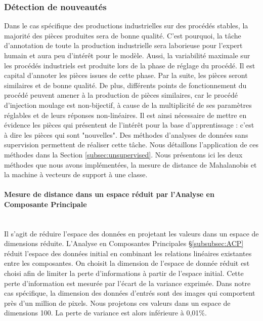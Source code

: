 \subsubsection{Détection de nouveautés}
Dans le cas spécifique des productions industrielles sur des procédés stables, la majorité des pièces produites sera de bonne qualité.
C'est pourquoi, la tâche d'annotation de toute la production industrielle sera laborieuse pour l'expert humain et aura peu d'intérêt pour le modèle.
Aussi, la variabilité maximale sur les procédés industriels est produite lors de la phase de réglage du procédé.
Il est capital d'annoter les pièces issues de cette phase.
Par la suite, les pièces seront similaires et de bonne qualité.
De plus, différents points de fonctionnement du procédé peuvent amener à la production de pièces similaires, car le procédé d'injection moulage est non-bijectif, à cause de la multiplicité de ses paramètres réglables et de leurs réponses non-linéaires.
Il est ainsi nécessaire de mettre en évidence les pièces qui présentent de l'intérêt pour la base d'apprentissage : c'est à dire les pièces qui sont "nouvelles".
Des méthodes d'analyses de données sans supervision permettent de réaliser cette tâche.
Nous détaillons l'application de ces méthodes dans la Section \ref{subsec:unsupervised}.
Nous présentons ici les deux méthodes que nous avons implémentées, la mesure de distance de Mahalanobis et la machine à vecteurs de support à une classe.

\paragraph{Mesure de distance dans un espace réduit par l'Analyse en Composante Principale}\mbox{} \\
Il s'agit de réduire l'espace des données en projetant les valeurs dans un espace de dimensions réduite.
L'Analyse en Composantes Principales §\ref{subsubsec:ACP} réduit l'espace des données initial en combinant les relations linéaires existantes entre les composantes.
On choisit la dimension de l'espace de donnée réduit est choisi afin de limiter la perte d'informations à partir de l'espace initial.
Cette perte d'information est mesurée par l'écart de la variance exprimée.
Dans notre cas spécifique, la dimension des données d'entrés sont des images qui comportent près d'un million de pixels.
Nous projetons ces valeurs dans un espace de dimensions 100.
La perte de variance est alors inférieure à 0,01\%.

